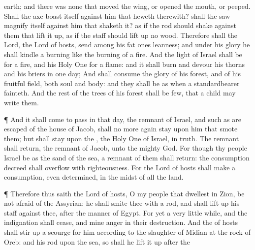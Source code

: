{earth; and there was none that
moved the
wing, or
opened the
mouth, or
peeped.
Shall the
axe
boast itself against him that
heweth therewith?
{} shall the
saw
magnify itself against him that
shaketh it? as if the
rod should
shake
{} against them that lift it
up,
{} as if the
staff should lift
up
{} no
wood.
Therefore shall the
Lord, the
Lord of
hosts,
send among his fat
ones
leanness; and under his
glory he shall
kindle a
burning like the burning of a
fire.
And the
light of
Israel shall be for a
fire, and his Holy
One for a
flame: and it shall
burn and
devour his
thorns and his
briers in
one
day;
And shall
consume the
glory of his
forest, and of his fruitful
field, both
soul and
body: and they shall be as when a
standardbearer
fainteth.
And the
rest of the
trees of his
forest shall be
few, that a
child may
write them.
\par }{\PP {}¶ And it shall come to pass in that
day,
{} the
remnant of
Israel, and such as are
escaped of the
house of
Jacob, shall no more
again
stay upon him that
smote them; but shall
stay upon the
{}, the Holy
One of
Israel, in
truth.
The
remnant shall
return,
{} the
remnant of
Jacob, unto the
mighty
God.
For though thy
people
Israel be as the
sand of the
sea,
{} a
remnant of them shall
return: the
consumption
decreed shall
overflow with
righteousness.
For the
Lord
{} of
hosts shall
make a
consumption, even
determined, in the
midst of all the
land.
\par }{\PP {}¶ Therefore thus
saith the
Lord
{} of
hosts, O my
people that
dwellest in
Zion, be not
afraid of the
Assyrian: he shall
smite thee with a
rod, and shall lift
up his
staff against thee, after the
manner of
Egypt.
For yet a
very little
while, and the
indignation shall
cease, and mine
anger in their
destruction.
And the
{} of
hosts shall stir
up a
scourge for him according to the
slaughter of
Midian at the
rock of
Oreb: and
{} his
rod
{} upon the
sea, so shall he lift it
up after the
}
